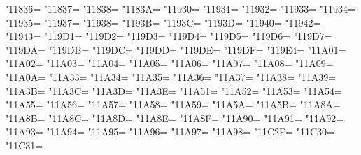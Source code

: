 \XeTeXcharclass"11836=\KclassCM
\XeTeXcharclass"11837=\KclassCM
\XeTeXcharclass"11838=\KclassCM
\XeTeXcharclass"1183A=\KclassCM
\XeTeXcharclass"11930=\KclassCM
\XeTeXcharclass"11931=\KclassCM
\XeTeXcharclass"11932=\KclassCM
\XeTeXcharclass"11933=\KclassCM
\XeTeXcharclass"11934=\KclassCM
\XeTeXcharclass"11935=\KclassCM
\XeTeXcharclass"11937=\KclassCM
\XeTeXcharclass"11938=\KclassCM
\XeTeXcharclass"1193B=\KclassCM
\XeTeXcharclass"1193C=\KclassCM
\XeTeXcharclass"1193D=\KclassCM
\XeTeXcharclass"11940=\KclassCM
\XeTeXcharclass"11942=\KclassCM
\XeTeXcharclass"11943=\KclassCM
\XeTeXcharclass"119D1=\KclassCM
\XeTeXcharclass"119D2=\KclassCM
\XeTeXcharclass"119D3=\KclassCM
\XeTeXcharclass"119D4=\KclassCM
\XeTeXcharclass"119D5=\KclassCM
\XeTeXcharclass"119D6=\KclassCM
\XeTeXcharclass"119D7=\KclassCM
\XeTeXcharclass"119DA=\KclassCM
\XeTeXcharclass"119DB=\KclassCM
\XeTeXcharclass"119DC=\KclassCM
\XeTeXcharclass"119DD=\KclassCM
\XeTeXcharclass"119DE=\KclassCM
\XeTeXcharclass"119DF=\KclassCM
\XeTeXcharclass"119E4=\KclassCM
\XeTeXcharclass"11A01=\KclassCM
\XeTeXcharclass"11A02=\KclassCM
\XeTeXcharclass"11A03=\KclassCM
\XeTeXcharclass"11A04=\KclassCM
\XeTeXcharclass"11A05=\KclassCM
\XeTeXcharclass"11A06=\KclassCM
\XeTeXcharclass"11A07=\KclassCM
\XeTeXcharclass"11A08=\KclassCM
\XeTeXcharclass"11A09=\KclassCM
\XeTeXcharclass"11A0A=\KclassCM
\XeTeXcharclass"11A33=\KclassCM
\XeTeXcharclass"11A34=\KclassCM
\XeTeXcharclass"11A35=\KclassCM
\XeTeXcharclass"11A36=\KclassCM
\XeTeXcharclass"11A37=\KclassCM
\XeTeXcharclass"11A38=\KclassCM
\XeTeXcharclass"11A39=\KclassCM
\XeTeXcharclass"11A3B=\KclassCM
\XeTeXcharclass"11A3C=\KclassCM
\XeTeXcharclass"11A3D=\KclassCM
\XeTeXcharclass"11A3E=\KclassCM
\XeTeXcharclass"11A51=\KclassCM
\XeTeXcharclass"11A52=\KclassCM
\XeTeXcharclass"11A53=\KclassCM
\XeTeXcharclass"11A54=\KclassCM
\XeTeXcharclass"11A55=\KclassCM
\XeTeXcharclass"11A56=\KclassCM
\XeTeXcharclass"11A57=\KclassCM
\XeTeXcharclass"11A58=\KclassCM
\XeTeXcharclass"11A59=\KclassCM
\XeTeXcharclass"11A5A=\KclassCM
\XeTeXcharclass"11A5B=\KclassCM
\XeTeXcharclass"11A8A=\KclassCM
\XeTeXcharclass"11A8B=\KclassCM
\XeTeXcharclass"11A8C=\KclassCM
\XeTeXcharclass"11A8D=\KclassCM
\XeTeXcharclass"11A8E=\KclassCM
\XeTeXcharclass"11A8F=\KclassCM
\XeTeXcharclass"11A90=\KclassCM
\XeTeXcharclass"11A91=\KclassCM
\XeTeXcharclass"11A92=\KclassCM
\XeTeXcharclass"11A93=\KclassCM
\XeTeXcharclass"11A94=\KclassCM
\XeTeXcharclass"11A95=\KclassCM
\XeTeXcharclass"11A96=\KclassCM
\XeTeXcharclass"11A97=\KclassCM
\XeTeXcharclass"11A98=\KclassCM
\XeTeXcharclass"11C2F=\KclassCM
\XeTeXcharclass"11C30=\KclassCM
\XeTeXcharclass"11C31=\KclassCM

